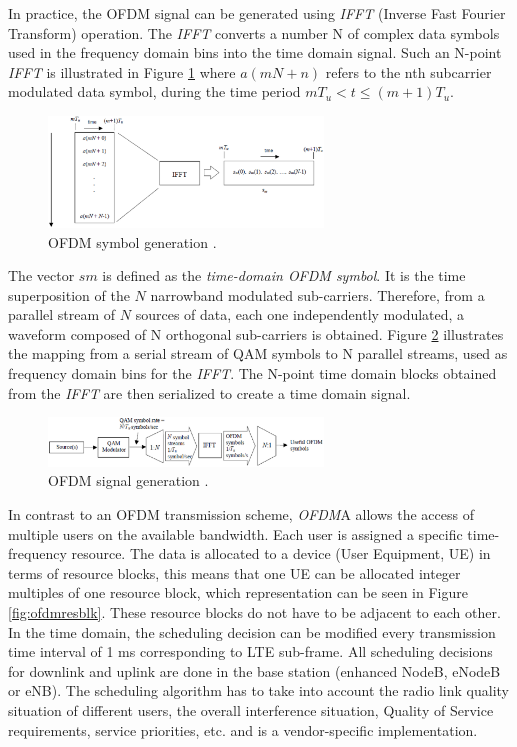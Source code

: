 In practice, the OFDM signal can be generated using \textit{IFFT} (Inverse Fast
Fourier Transform) operation. The \textit{IFFT} converts a number N of complex
data symbols used in the frequency domain bins into the time domain signal. Such
an N-point \textit{IFFT} is illustrated in Figure \ref{fig:ofdmsymbol} where
$a(mN+n)$ refers to the nth subcarrier modulated data symbol, during the time
period $mT_u < t \le (m+1)T_u$.

\begin{figure}[htbp]
    \centering
    \includegraphics[width=0.65\textwidth]{./figures/ofdm_symbol_gen}
    \caption{ OFDM symbol generation \cite{umtslte}.
    \label{fig:ofdmsymbol}}
\end{figure}

The vector $sm$ is defined as the \emph{time-domain OFDM symbol}. It is the time
superposition of the $N$ narrowband modulated sub-carriers. Therefore, from a
parallel stream of $N$ sources of data, each one independently modulated, a
waveform composed of N orthogonal sub-carriers is obtained. Figure
\ref{fig:ofdmchain} illustrates the mapping from a serial stream of QAM symbols
to N parallel streams, used as frequency domain bins for the \textit{IFFT}. The
N-point time domain blocks obtained from the \textit{IFFT} are then serialized
to create a time domain signal.

\begin{figure}[htbp]
    \centering
    \includegraphics[width=0.65\textwidth]{./figures/ofdm_signal_chain}
    \caption{ OFDM signal generation \cite{umtslte}.
    \label{fig:ofdmchain}}
\end{figure}

In contrast to an OFDM transmission scheme, \textit{OFDM}A allows the access of
multiple users on the available bandwidth. Each user is assigned a specific
time-frequency resource. The data is allocated to a device (User Equipment, UE)
in terms of resource blocks, this means that one UE can be allocated integer
multiples of one resource block, which representation can be seen in Figure
\ref{fig:ofdmresblk}. These resource blocks do not have to be adjacent to each
other. In the time domain, the scheduling decision can be modified every
transmission time interval of 1 ms corresponding to LTE sub-frame. All scheduling
decisions for downlink and uplink are done in the base station (enhanced NodeB,
eNodeB or eNB). The scheduling algorithm has to take into account the radio link
quality situation of different users, the overall interference situation,
Quality of Service requirements, service priorities, etc. and is a
vendor-specific implementation.

